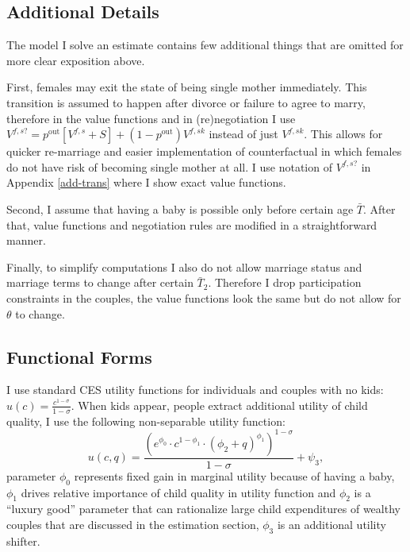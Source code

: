 \subsection{Additional Details}
The model I solve an estimate contains few additional things that are omitted for more clear exposition above.

First, females may exit the state of being single mother immediately. This transition is assumed to happen after divorce or failure to agree to marry, therefore in the value functions and in (re)negotiation I use $V^{f,s?} = p^{\text{out}} [V^{f,s} + S] + (1-p^{\text{out}})V^{f,sk}$ instead of just $V^{f,sk}$. This allows for quicker re-marriage and easier implementation of counterfactual in which females do not have risk of becoming single mother at all. I use notation of $V^{f,s?}$ in Appendix \ref{add-trans} where I show exact value functions.

Second, I assume that having a baby is possible only before certain age $\bar{T}$. After that, value functions and negotiation rules are modified in a straightforward manner.

Finally, to simplify computations I also do not allow marriage status and marriage terms to change after certain $\bar{T}_2$. Therefore I drop participation constraints in the couples, the value functions look the same but do not allow for $\theta$ to change.

\subsection{Functional Forms}
I use standard CES utility functions for individuals and couples with no kids: $u(c) = \frac{c^{1-\sigma}}{1-\sigma}$.  When kids appear, people extract additional utility of child quality, I use the following non-separable utility function:
\[u(c,q) = \frac{\left(e^{\phi_0}\cdot c^{1-\phi_1} \cdot (\phi_2 + q)^{\phi_1}\right)^{1-\sigma}}{1-\sigma} + \psi_3,\]
parameter $\phi_0$ represents fixed gain in marginal utility because of having a baby, $\phi_1$ drives relative importance of child quality in utility function and $\phi_2$ is a ``luxury good'' parameter that can rationalize large child expenditures of wealthy couples that are discussed in the estimation section, $\phi_3$ is an additional utility shifter.